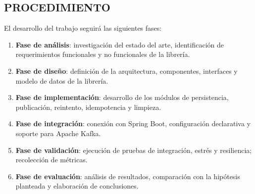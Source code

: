 \subsection{PROCEDIMIENTO}

El desarrollo del trabajo seguirá las siguientes fases:

\begin{enumerate}
    \item \textbf{Fase de análisis}: investigación del estado del arte, identificación de requerimientos funcionales y no funcionales de la librería.
    \item \textbf{Fase de diseño}: definición de la arquitectura, componentes, interfaces y modelo de datos de la librería.
    \item \textbf{Fase de implementación}: desarrollo de los módulos de persistencia, publicación, reintento, idempotencia y limpieza.
    \item \textbf{Fase de integración}: conexión con Spring Boot, configuración declarativa y soporte para Apache Kafka.
    \item \textbf{Fase de validación}: ejecución de pruebas de integración, estrés y resiliencia; recolección de métricas.
    \item \textbf{Fase de evaluación}: análisis de resultados, comparación con la hipótesis planteada y elaboración de conclusiones.
\end{enumerate}
